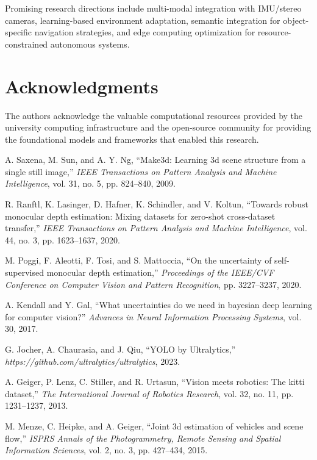 \documentclass[12pt,oneside]{book}
\begin{document}
Promising research directions include multi-modal integration with IMU/stereo cameras, learning-based environment adaptation, semantic integration for object-specific navigation strategies, and edge computing optimization for resource-constrained autonomous systems.

\section*{Acknowledgments}

The authors acknowledge the valuable computational resources provided by the university computing infrastructure and the open-source community for providing the foundational models and frameworks that enabled this research.

\begin{thebibliography}{99}

A. Saxena, M. Sun, and A. Y. Ng,
``Make3d: Learning 3d scene structure from a single still image,''
\emph{IEEE Transactions on Pattern Analysis and Machine Intelligence}, vol. 31, no. 5, pp. 824--840, 2009.

R. Ranftl, K. Lasinger, D. Hafner, K. Schindler, and V. Koltun,
``Towards robust monocular depth estimation: Mixing datasets for zero-shot cross-dataset transfer,''
\emph{IEEE Transactions on Pattern Analysis and Machine Intelligence}, vol. 44, no. 3, pp. 1623--1637, 2020.

M. Poggi, F. Aleotti, F. Tosi, and S. Mattoccia,
``On the uncertainty of self-supervised monocular depth estimation,''
\emph{Proceedings of the IEEE/CVF Conference on Computer Vision and Pattern Recognition}, pp. 3227--3237, 2020.

A. Kendall and Y. Gal,
``What uncertainties do we need in bayesian deep learning for computer vision?''
\emph{Advances in Neural Information Processing Systems}, vol. 30, 2017.

G. Jocher, A. Chaurasia, and J. Qiu,
``YOLO by Ultralytics,''
\emph{https://github.com/ultralytics/ultralytics}, 2023.

A. Geiger, P. Lenz, C. Stiller, and R. Urtasun,
``Vision meets robotics: The kitti dataset,''
\emph{The International Journal of Robotics Research}, vol. 32, no. 11, pp. 1231--1237, 2013.

M. Menze, C. Heipke, and A. Geiger,
``Joint 3d estimation of vehicles and scene flow,''
\emph{ISPRS Annals of the Photogrammetry, Remote Sensing and Spatial Information Sciences}, vol. 2, no. 3, pp. 427--434, 2015.


\end{thebibliography}
\end{document}
